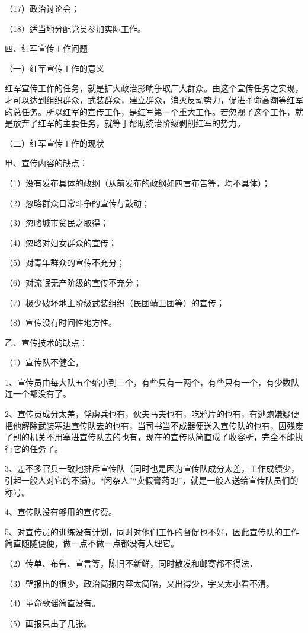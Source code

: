 （17）政治讨论会；

（18）适当地分配党员参加实际工作。

四、红军宣传工作问题

（一）红军宣传工作的意义

红军宣传工作的任务，就是扩大政治影响争取广大群众。由这个宣传任务之实现，才可以达到组织群众，武装群众，建立群众，消灭反动势力，促进革命高潮等红军的总任务。所以红军的宣传工作，是红军第一个重大工作。若忽视了这个工作，就是放弃了红军的主要任务，就等于帮助统治阶级剥削红军的势力。

（二）红军宣传工作的现状

甲、宣传内容的缺点：

（1）没有发布具体的政纲（从前发布的政纲如四言布告等，均不具体）；

（2）忽略群众日常斗争的宣传与鼓动；

（3）忽略城市贫民之取得；

（4）忽略对妇女群众的宣传；

（5）对青年群众的宣传不充分；

（6）对流氓无产阶级的宣传不充分；

（7）极少破坏地主阶级武装组织（民团靖卫团等）的宣传；

（8）宣传没有时间性地方性。

乙、宣传技术的缺点：

（1）宣传队不健全，

1、宣传员由每大队五个缩小到三个，有些只有一两个，有些只有一个，有少数队连一个都没有了。

2、宣传员成分太差，俘虏兵也有，伙夫马夫也有，吃鸦片的也有，有逃跑嫌疑便把他解除武装塞进宣传队去的也有，当司书当不成器便送入宣传队的也有，因残废了别的机关不用塞进宣传队去的也有，现在的宣传队简直成了收容所，完全不能执行它的任务了。

3、差不多官兵一致地排斥宣传队（同时也是因为宣传队成分太差，工作成绩少，引起一般人对它的不满）。“闲杂人”“卖假膏药的”，就是一般人送给宣传队员们的称号。

4、宣传队没有够用的宣传费。

5、对宣传员的训练没有计划，同时对他们工作的督促也不好，因此宣传队的工作简直随随便便，做一点不做一点都没有人理它。

（2）传单、布告、宣言等，陈旧不新鲜，同时散发和邮寄都不得法．

（3）壁报出的很少，政治简报内容太简略，又出得少，字又太小看不清。

（4）革命歌谣简直没有。

（5）画报只出了几张。

